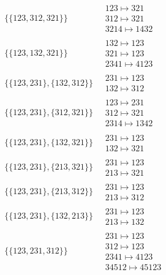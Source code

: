 \begin{scriptsize}
\begin{align}
\{\{123, 312, 321\}\}
\ 
&
\begin{matrix}
123 \mapsto 321
\\
312 \mapsto 321
\\
3214 \mapsto 1432
\end{matrix}
\\
\{\{123, 132, 321\}\}
\ 
&
\begin{matrix}
132 \mapsto 123
\\
321 \mapsto 123
\\
2341 \mapsto 4123
\end{matrix}
\\
\{\{123, 231\}, \{132, 312\}\}
\ 
&
\begin{matrix}
231 \mapsto 123
\\
132 \mapsto 312
\end{matrix}
\\
\{\{123, 231\}, \{312, 321\}\}
\ 
&
\begin{matrix}
123 \mapsto 231
\\
312 \mapsto 321
\\
2314 \mapsto 1342
\end{matrix}
\\
\{\{123, 231\}, \{132, 321\}\}
\ 
&
\begin{matrix}
231 \mapsto 123
\\
132 \mapsto 321
\end{matrix}
\\
\{\{123, 231\}, \{213, 321\}\}
\ 
&
\begin{matrix}
231 \mapsto 123
\\
213 \mapsto 321
\end{matrix}
\\
\{\{123, 231\}, \{213, 312\}\}
\ 
&
\begin{matrix}
231 \mapsto 123
\\
213 \mapsto 312
\end{matrix}
\\
\{\{123, 231\}, \{132, 213\}\}
\ 
&
\begin{matrix}
231 \mapsto 123
\\
213 \mapsto 132
\end{matrix}
\\
\{\{123, 231, 312\}\}
\ 
&
\begin{matrix}
231 \mapsto 123
\\
312 \mapsto 123
\\
2341 \mapsto 4123
\\
34512 \mapsto 45123
\end{matrix}
\\

\end{align}
\end{scriptsize}
